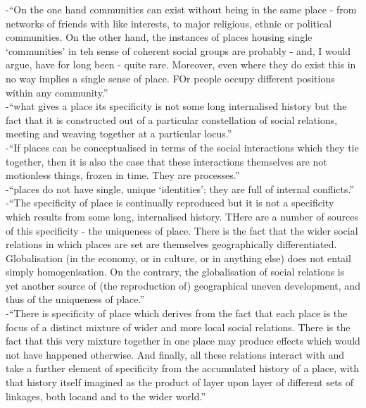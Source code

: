 -{\color{orange}“On the one hand communities can exist without being in the same place - from networks of friends with like interests, to major religious, ethnic or political communities. On the other hand, the instances of places housing single ‘communities’ in teh sense of coherent social groups are probably - and, I would argue, have for long been - quite rare. Moreover, even where they do exist this in no way implies a single sense of place. FOr people occupy different positions within any community.”}\cite{MasseyD1991}\\
-{\color{orange}“what gives a place its specificity is not some long internalised history but the fact that it is constructed out of a particular constellation of social relations, meeting and weaving together at a particular locus.”}\cite{MasseyD1991}\\
-{\color{orange}“If places can be conceptualised in terms of the social interactions which they tie together, then it is also the case that these interactions themselves are not motionless things, frozen in time. They are processes.”}\cite{MasseyD1991}\\
-{\color{orange}“places do not have single, unique ‘identities’; they are full of internal conflicts.”}\cite{MasseyD1991}\\
-{\color{orange}“The specificity of place is continually reproduced but it is not a specificity which results from some long, internalised history. THere are a number of sources of this specificity - the uniqueness of place. There is the fact that the wider social relations in which places are set are themselves geographically differentiated. Globalisation (in the economy, or in culture, or in anything else) does not entail simply homogenisation. On the contrary, the globalisation of social relations is yet another source of (the reproduction of) geographical uneven development, and thus of the uniqueness of place.”}\cite{MasseyD1991}\\
-{\color{orange}“There is specificity of place which derives from the fact that each place is the focus of a distinct mixture of wider and more local social relations. There is the fact that this very mixture together in one place may produce effects which would not have happened otherwise. And finally, all these relations interact with and take a further element of specificity from the accumulated history of a place, with that history itself imagined as the product of layer upon layer of different sets of linkages, both locand and to the wider world.”
}\cite{MasseyD1991}\\
